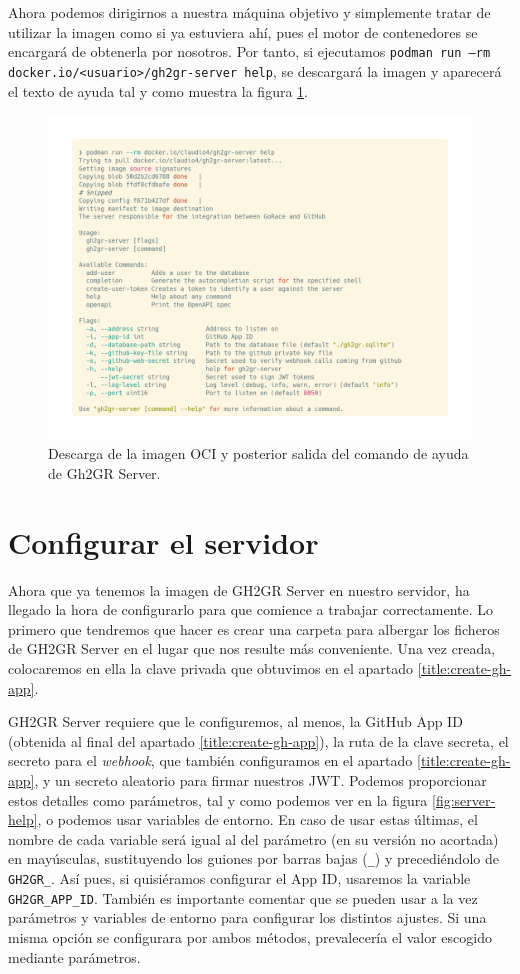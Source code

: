 \begin{sloppypar}
Ahora podemos dirigirnos a nuestra máquina objetivo y simplemente tratar de utilizar la imagen como si ya estuviera ahí, pues el motor de contenedores se encargará de obtenerla por nosotros. Por tanto, si ejecutamos \texttt{podman  run  --rm docker.io/<usuario>/gh2gr-server help}, se descargará la imagen y aparecerá el texto de ayuda tal y como muestra la figura \ref{fig:server-help-remote}.
\end{sloppypar}

\begin{figure}
    \centering
    \includegraphics[width=0.75\linewidth]{images/server-help-remote.png}
    \caption{Descarga de la imagen OCI y posterior salida del comando de ayuda de Gh2GR Server.}
    \label{fig:server-help-remote}
\end{figure}

\section{Configurar el servidor} \label{title:config-server}
Ahora que ya tenemos la imagen de GH2GR Server en nuestro servidor, ha llegado la hora de configurarlo para que comience a trabajar correctamente. Lo primero que tendremos que hacer es crear una carpeta para albergar los ficheros de GH2GR Server en el lugar que nos resulte más conveniente. Una vez creada, colocaremos en ella la clave privada que obtuvimos en el apartado \ref{title:create-gh-app}.

GH2GR Server requiere que le configuremos, al menos, la GitHub App ID (obtenida al final del apartado \ref{title:create-gh-app}), la ruta de la clave secreta, el secreto para el \textit{webhook}, que también configuramos en el apartado \ref{title:create-gh-app}, y un secreto aleatorio para firmar nuestros \acrshort{JWT}. Podemos proporcionar estos detalles como parámetros, tal y como podemos ver en la figura \ref{fig:server-help}, o podemos usar variables de entorno. En caso de usar estas últimas, el nombre de cada variable será igual al del parámetro (en su versión no acortada) en mayúsculas, sustituyendo los guiones por barras bajas (\texttt{\_}) y precediéndolo de \texttt{GH2GR\_}. Así pues, si quisiéramos configurar el App ID, usaremos la variable \texttt{GH2GR\_APP\_ID}. También es importante comentar que se pueden usar a la vez parámetros y variables de entorno para configurar los distintos ajustes. Si una misma opción se configurara por ambos métodos, prevalecería el valor escogido mediante parámetros.

